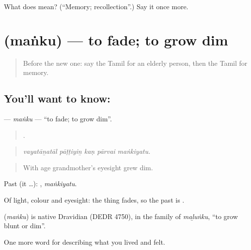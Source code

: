 \begin{tcolorbox}[breakable,colback=teal!4,colframe=teal!35!black,title={Before you move on}]
What does  mean? (\textquotedblleft{}Memory; recollection\textquotedblright{}.) Say it once more.
\end{tcolorbox}
\section[\texorpdfstring{\ta{மங்கு} (maṅku)}{மங்கு (maṅku)}]{ (maṅku) — to fade; to grow dim}

\label{lesson:TA-C504-manku}



\begin{quote}
Before the new one: say the Tamil for an elderly person, then the Tamil for memory.
\end{quote}

\subsection*{You'll want to know: }
\textbf{} — \emph{maṅku} — \textquotedblleft{}to fade; to grow dim\textquotedblright{}.

\begin{quote}
    .
\end{quote}

\begin{quote}
\emph{vayatāṉatāl pāṭṭiyiṉ kaṇ pārvai maṅkiyatu.}
\end{quote}

\begin{quote}
With age grandmother’s eyesight grew dim.
\end{quote}

Past (it …): , \emph{maṅkiyatu}.

Of light, colour and eyesight: the thing fades, so the past is .

\begin{cousinweb}
\textbf{} (\emph{maṅku}) is native Dravidian (DEDR 4750), in the family of  \emph{maḻuṅku}, \textquotedblleft{}to grow blunt or dim\textquotedblright{}.
\end{cousinweb}

\begin{grammarlens}[title={What you've built}]
One more word for describing what you lived and felt.
\end{grammarlens}

